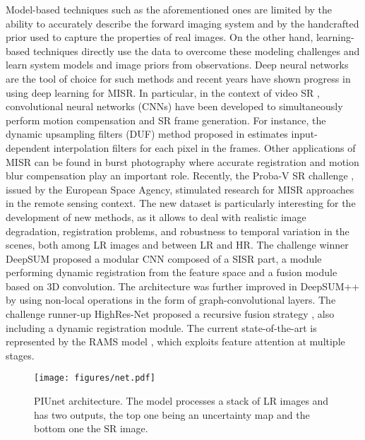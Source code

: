\documentclass[journal]{IEEEtran}
\begin{document}
Model-based techniques such as the aforementioned ones are limited by the ability to accurately describe the forward imaging system and by the handcrafted prior used to capture the properties of real images. On the other hand, learning-based techniques directly use the data to overcome these modeling challenges and learn system models and image priors from observations. Deep neural networks are the tool of choice for such methods and recent years have shown progress in using deep learning for MISR. In particular, in the context of video SR \cite{7444187,DBLP:journals/corr/CaballeroLAATWS16}, convolutional neural networks (CNNs) have been developed to simultaneously perform motion compensation and SR frame generation. For instance, the dynamic upsampling filters (DUF) method proposed in \cite{Jo_2018_CVPR} estimates input-dependent interpolation filters for each pixel in the frames. Other applications of MISR can be found in burst photography \cite{bhat2021deep} where accurate registration and motion blur compensation play an important role. Recently, the Proba-V SR challenge \cite{martens2019super,web:kelvins}, issued by the European Space Agency, stimulated research for MISR approaches in the remote sensing context. The new dataset is particularly interesting for the development of new methods, as it allows to deal with realistic image degradation, registration problems, and robustness to temporal variation in the scenes, both among LR images and between LR and HR. The challenge winner DeepSUM \cite{molini2019deepsum} proposed a modular CNN composed of a SISR part, a module performing dynamic registration from the feature space and a fusion module based on 3D convolution. The architecture was further improved in DeepSUM++ \cite{molini2020deepsumpp} by using non-local operations in the form of graph-convolutional layers. The challenge runner-up HighRes-Net \cite{rarefin2020multi} proposed a recursive fusion strategy , also including a dynamic registration module. The current state-of-the-art is represented by the RAMS model \cite{salvetti2020multi}, which exploits feature attention at multiple stages. 



 \begin{figure*}[ht]
\centering
\texttt{[image: figures/net.pdf]}
\caption{PIUnet architecture. The model processes a stack of LR images and has two outputs, the top one being an uncertainty map and the bottom one the SR image.}
\label{fig:net}
\end{figure*}
\end{document}

